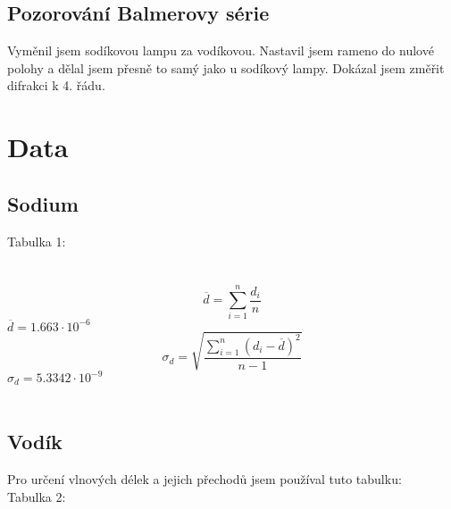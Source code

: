 \documentclass{article}
\begin{document}
\subsection{Pozorování Balmerovy série}
Vyměnil jsem sodíkovou lampu za vodíkovou.
Nastavil jsem rameno do nulové polohy a dělal jsem přesně to samý jako u sodíkový lampy.
Dokázal jsem změřit difrakci k 4. řádu.
\section{Data}
\subsection{Sodium}
\footnotesize{Tabulka 1:}\\
\large{
\\
}
\vspace{1em}
\\
$$\overline{d} = \sum^{n}_{i=1}\frac{d_{i}}{n}$$
$\overline{d} = 1.663 \cdot 10^{-6}$\\

$$\sigma_{d} = \sqrt{\frac{\sum^{n}_{i=1}(d_{i} - \overline{d})^{2}}{n-1}}$$
$\sigma_{d} = 5.3342 \cdot 10^{-9}$
\\
\vspace{1em}
\\
\subsection{Vodík}
Pro určení vlnových délek a jejich přechodů jsem používal tuto tabulku:\\
\footnotesize{Tabulka 2:}\\
\large{
\\
}
\vspace{1em}
\\
\end{document}
